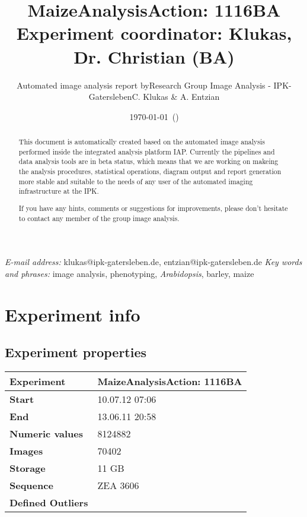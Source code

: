 % 





\title{MaizeAnalysisAction: 1116BA \tabularnewline \vspace{10 mm} \large{Experiment coordinator: Klukas, Dr. Christian (BA)}}

\author{Automated image analysis report by\tabularnewline Research
	Group Image Analysis - IPK-Gatersleben\tabularnewline \tabularnewline C. Klukas
	\& A. Entzian}

\date{\today ~(\currenttime )}

\maketitle
\thispagestyle{empty}  
\begin{abstract}
This document is automatically created based on the automated image analysis performed 
inside the integrated analysis platform IAP. Currently the pipelines and data analysis tools are in beta status, 
which means that we are working on makeing the analysis procedures, statistical operations, diagram output and report
generation more stable and suitable to the needs of any user of the automated imaging infrastructure at the IPK.

If you have any hints, comments or suggestions for improvements, please don't hesitate to contact any member
		of the group image analysis.
		\end{abstract}
		\vfill
		\small{\textit{E-mail address:} klukas@ipk-gatersleben.de, entzian@ipk-gatersleben.de}
		\newline 
		\small{\textit{Key words and phrases:} image analysis, phenotyping, \textit{Arabidopsis}, barley, maize }
		
		\addtocounter{page}{-1}
		\clearpage
		\tableofcontents
		
		\clearpage
		\pagestyle{headings}
		\section{Experiment info} 
		\subsection{Experiment properties}
		\begin{center}
		\begin{tabular}{|p{3cm}|p{13cm}|}
		\hline
		{\textbf{Experiment}} & MaizeAnalysisAction: 1116BA\tabularnewline
		\hline
		\hline
		{\textbf{Start}} & 10.07.12 07:06\tabularnewline
		\hline
		{\textbf{End}} & 13.06.11 20:58\tabularnewline
		\hline
		{\textbf{Numeric values}} & 8124882 \tabularnewline
		\hline
		{\textbf{Images}} & 70402 \tabularnewline
		\hline
		{\textbf{Storage}} & 11 GB \tabularnewline
		\hline
		{\textbf{Sequence}} & ZEA 3606 \tabularnewline
		\hline
		{\textbf{Defined Outliers}} &  \tabularnewline
		\hline
		\hline 
		\end{tabular}
		\end{center}
		
